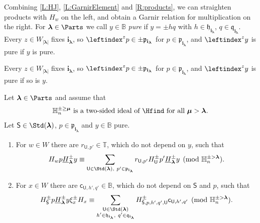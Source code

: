 \documentclass[a4paper,11pt]{amsart}
\newcommand\blam{{\boldsymbol\lambda}}
\newcommand\bmu{{\boldsymbol\mu}}
\newcommand\bi{\mathbf{i}}
\newcommand\ilam[1][\blam]{\bi_{#1}}
\numberwithin{equation}{subsection}
\theoremstyle{definition}
\theoremstyle{theorem}
\theoremstyle{remark}
\newcommand\plam[1][\lambda]{\mathfrak{p}_{#1}}
\newcommand\hlam[1][\lambda]{\mathfrak{h}_{#1}}
\newcommand\qlam[1][\lambda]{\mathfrak{q}_{#1}}
\newcommand\HH{\mathbb{H}}
\newcommand\HJpm{\underline{H}^\pm}
\newcommand\Sym{W}
\newcommand\xipm{\xi^\pm}
\newcommand\bc{\mathsf{c}}
\newcommand\bS{{\mathsf{S}}}
\newcommand\bU{{\mathsf{U}}}
\newcommand\Tos{\mathbb{T}}
\newcommand{\Bo}{\mathbb{B}}
\begin{document}
Combining \autoref{L:HJ}, \autoref{L:GarnirElement} and \autoref{R:products}, we can straighten
products with $H_w$ on the left, and obtain a Garnir relation for multiplication on the right.
For $\blam\in\Parts$ we call $y\in\Bo$ \emph{pure} if $y=\pm hq$ with $h\in\hlam[\ilam]$,
$q\in\qlam[\ilam]$. Every $z\in\Sym_{|\blam|}$ fixes $\ilam$, so $\leftindex^zp\in\pm\plam[\ilam]$
for $p\in\plam[\ilam]$, and $\leftindex^zy$ is pure if $y$ is pure.

Every $z\in\Sym_{|\blam|}$ fixes $\ilam$, so $\leftindex^zp\in\pm\plam[\ilam]$
for $p\in\plam[\ilam]$, and $\leftindex^zy$ is pure if so is $y$.
\begin{Proposition}\label{P:Straighten}
  Let $\blam\in\Parts$ and assume that
  \begin{equation}\label{E:IH}
    \HH^{\pm\ge\bmu}_n\text{ is a two-sided ideal of }\Hfind\text{ for all }\bmu>\blam.
  \end{equation}
  Let $\bS\in\Std(\blam)$, $p\in\plam[\ilam]$ and $y\in\Bo$ pure.
  \begin{enumerate}
  \item\label{Straighten1} For $w\in\Sym$ there are $r_{\bU,p'}\in\Tos$, which do not depend on $y$, such that
    \[
      H_wp\HJpm_\blam y\equiv\sum_{\bU\in\Std(\blam),\ p'\in\plam[\ilam]}
        r_{\bU,p'}H^\pm_\bU p'\HJpm_\blam y\pmod{\HH^{\pm>\blam}_n}.
    \]
  \item\label{Straighten2} For $x\in\Sym$ there are $\bc_{\bU,h',q'}\in\Bo$, which do not depend on $\bS$ and $p$, such that
    \[
      H^\pm_\bS p\HJpm_\blam y\xipm_xH_x\equiv
      \sum_{\substack{\bU\in\Std(\blam)\\h'\in\hlam[\ilam],\ q'\in\qlam[\ilam]}}
        H^\pm_{\bS,p,h',q',\bU}\bc_{\bU,h',q'}\pmod{\HH^{\pm>\blam}_n}.
    \]
  \end{enumerate}
\end{Proposition}
\end{document}
